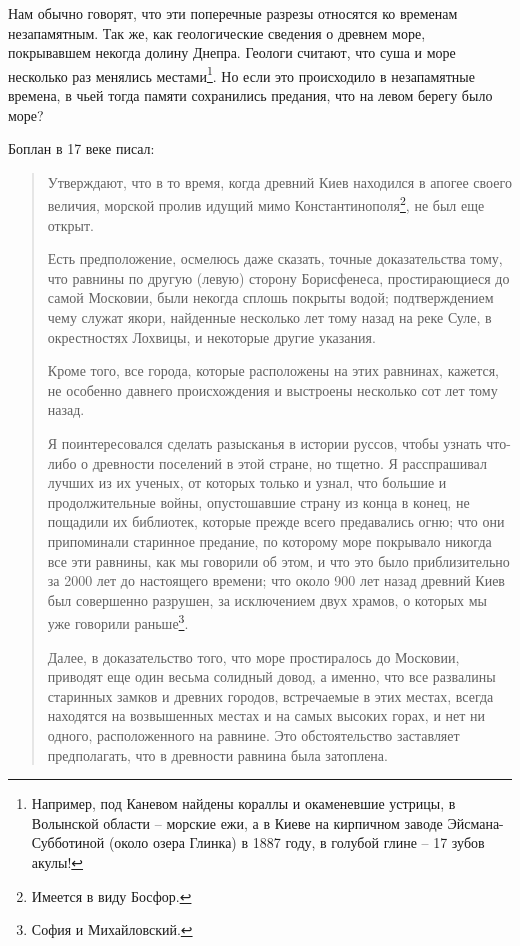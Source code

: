 Нам обычно говорят, что эти поперечные разрезы относятся ко временам незапамятным. Так же, как геологические сведения о древнем море, покрывавшем некогда долину Днепра. Геологи считают, что суша и море несколько раз менялись местами\footnote{Например, под Каневом найдены кораллы и окаменевшие устрицы, в Волынской области – морские ежи, а в Киеве на кирпичном заводе Эйсмана-Субботиной (около озера Глинка) в 1887 году, в голубой глине – 17 зубов акулы!\cite{arhsved01}}. Но если это происходило в незапамятные времена, в чьей тогда памяти сохранились предания, что на левом берегу было море?

Боплан в 17 веке писал\cite{boplan01}:

\begin{quotation}
Утверждают, что в то время, когда древний Киев находился в апогее своего величия, морской пролив идущий мимо Константинополя\footnote{Имеется в виду Босфор.}, не был еще открыт. 

Есть предположение, осмелюсь даже сказать, точные доказательства тому, что равнины по другую (левую) сторону Борисфенеса, простирающиеся до самой Московии, были некогда сплошь покрыты водой; подтверждением чему служат якори, найденные несколько лет тому назад на реке Суле, в окрестностях Лохвицы, и некоторые другие указания. 

Кроме того, все города, которые расположены на этих равнинах, кажется, не особенно давнего происхождения и выстроены несколько сот лет тому назад.

Я поинтересовался сделать разысканья в истории руссов, чтобы узнать что-либо о древности поселений в этой стране, но тщетно. Я расспрашивал лучших из их ученых, от которых только и узнал, что большие и продолжительные войны, опустошавшие страну из конца в конец, не пощадили их библиотек, которые прежде всего предавались огню; что они припоминали старинное предание, по которому море покрывало никогда все эти равнины, как мы говорили об этом, и что это было приблизительно за 2000 лет до настоящего времени; что около 900 лет назад древний Киев был совершенно разрушен, за исключением двух храмов, о которых мы уже говорили раньше\footnote{София и Михайловский.}. 

Далее, в доказательство того, что море простиралось до Московии, приводят еще один весьма солидный довод, а именно, что все развалины старинных замков и древних городов, встречаемые в этих местах, всегда находятся на возвышенных местах и на самых высоких горах, и нет ни одного, расположенного на равнине. Это обстоятельство заставляет предполагать, что в древности равнина была затоплена.
\end{quotation}

